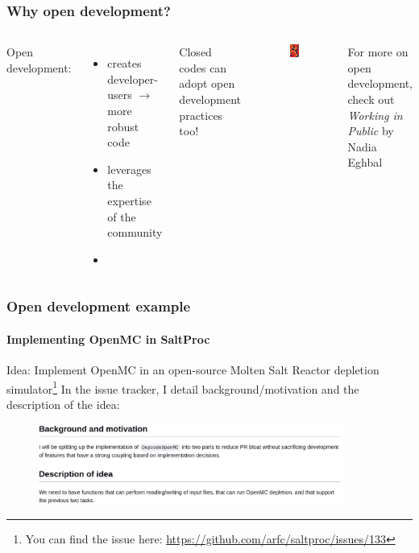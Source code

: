 \begin{frame}
  \frametitle{Why open development?} 
  \begin{columns}
      \column[t]{5cm}
      Open development:
      \begin{itemize}
          \item creates developer-users $\rightarrow$ more robust code
          \item leverages the expertise of the community 
          \item 
      \end{itemize}

      Closed codes can adopt open development practices too!

      \column[t]{5cm}
      \begin{figure}[htpb]
          \centering
          \includegraphics[width=2cm]{images/working-in-public.png}
      \end{figure}
      For more on open development, check out {\it Working in Public} by Nadia Eghbal \cite{eghbal_working_2020}

      
  \end{columns}
\end{frame}

\begin{frame}[fragile]
    \frametitle{Open development example}
    \framesubtitle{Implementing OpenMC in SaltProc}

    Idea: Implement OpenMC in an open-source Molten Salt Reactor depletion simulator\footnote{You can find the issue here: \url{https://github.com/arfc/saltproc/issues/133}} 
    \newline
    \newline
    In the issue tracker, I detail background/motivation and the description of the idea:


    \vspace{0.5cm}
    \begin{figure}[htpb]
        \centering
        \includegraphics[width=10cm]{images/open-dev-ex1.png}
    \end{figure}

    
\end{frame}

